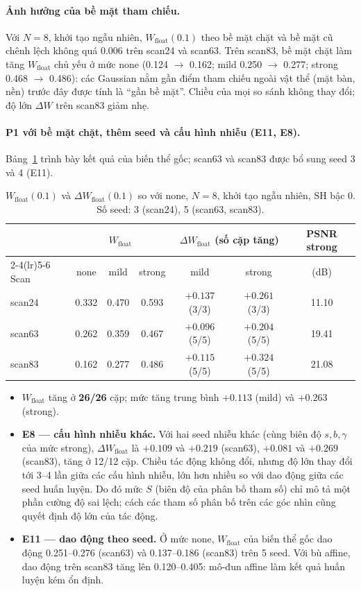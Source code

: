 \documentclass[11pt,a4paper]{article}
\begin{document}
\paragraph{Ảnh hưởng của bề mặt tham chiếu.} Với $N=8$, khởi tạo ngẫu nhiên, $W_{\text{float}}(0.1)$ theo bề mặt chặt và bề mặt cũ chênh lệch không quá 0.006 trên scan24 và scan63. Trên scan83, bề mặt chặt làm tăng $W_{\text{float}}$ chủ yếu ở mức none (0.124 $\to$ 0.162; mild 0.250 $\to$ 0.277; strong 0.468 $\to$ 0.486): các Gaussian nằm gần điểm tham chiếu ngoài vật thể (mặt bàn, nền) trước đây được tính là ``gần bề mặt''. Chiều của mọi so sánh không thay đổi; độ lớn $\Delta W$ trên scan83 giảm nhẹ.

\paragraph{P1 với bề mặt chặt, thêm seed và cấu hình nhiễu (E11, E8).} Bảng~\ref{tab:p1final} trình bày kết quả của biến thể gốc; scan63 và scan83 được bổ sung seed 3 và 4 (E11).
\begin{table}[H]
\centering\small
\caption{$W_{\text{float}}(0.1)$ và $\Delta W_{\text{float}}(0.1)$ so với none, $N=8$, khởi tạo ngẫu nhiên, SH bậc 0. Số seed: 3 (scan24), 5 (scan63, scan83).}
\label{tab:p1final}
\begin{tabular}{@{}lcccccc@{}}
\toprule
& \multicolumn{3}{c}{$W_{\text{float}}$} & \multicolumn{2}{c}{$\Delta W_{\text{float}}$ (số cặp tăng)} & PSNR strong \\
\cmidrule(lr){2-4}\cmidrule(lr){5-6}
Scan & none & mild & strong & mild & strong & (dB) \\
\midrule
scan24 & 0.332 & 0.470 & 0.593 & $+0.137$ (3/3) & $+0.261$ (3/3) & 11.10 \\
scan63 & 0.262 & 0.359 & 0.467 & $+0.096$ (5/5) & $+0.204$ (5/5) & 19.41 \\
scan83 & 0.162 & 0.277 & 0.486 & $+0.115$ (5/5) & $+0.324$ (5/5) & 21.08 \\
\bottomrule
\end{tabular}
\end{table}
\begin{itemize}
  \item $W_{\text{float}}$ tăng ở \textbf{26/26} cặp; mức tăng trung bình $+0.113$ (mild) và $+0.263$ (strong).
  \item \textbf{E8 --- cấu hình nhiễu khác.} Với hai seed nhiễu khác (cùng biên độ $s,b,\gamma$ của mức strong), $\Delta W_{\text{float}}$ là $+0.109$ và $+0.219$ (scan63), $+0.081$ và $+0.269$ (scan83), tăng ở 12/12 cặp. Chiều tác động không đổi, nhưng độ lớn thay đổi tới 3--4 lần giữa các cấu hình nhiễu, lớn hơn nhiều so với dao động giữa các seed huấn luyện. Do đó mức $S$ (biên độ của phân bố tham số) chỉ mô tả một phần cường độ sai lệch; cách các tham số phân bố trên các góc nhìn cũng quyết định độ lớn của tác động.
  \item \textbf{E11 --- dao động theo seed.} Ở mức none, $W_{\text{float}}$ của biến thể gốc dao động 0.251--0.276 (scan63) và 0.137--0.186 (scan83) trên 5 seed. Với bù affine, dao động trên scan83 tăng lên 0.120--0.405: mô-đun affine làm kết quả huấn luyện kém ổn định.
\end{itemize}
\end{document}
